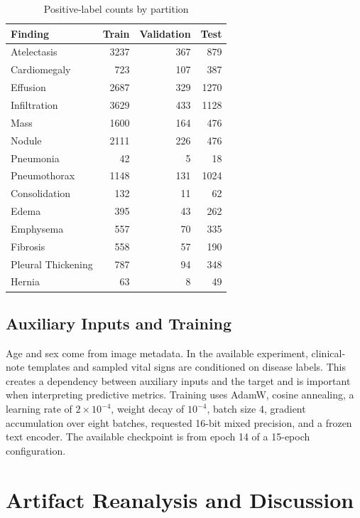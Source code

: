 \documentclass[runningheads,a4paper]{llncs}
\begin{document}
\begin{table}[htbp]
\caption{Positive-label counts by partition}
\label{tab:prevalence}
\centering\small
\begin{tabular}{lrrr}
\toprule
Finding & Train & Validation & Test\\
\midrule
Atelectasis & 3237 & 367 & 879\\
Cardiomegaly & 723 & 107 & 387\\
Effusion & 2687 & 329 & 1270\\
Infiltration & 3629 & 433 & 1128\\
Mass & 1600 & 164 & 476\\
Nodule & 2111 & 226 & 476\\
Pneumonia & 42 & 5 & 18\\
Pneumothorax & 1148 & 131 & 1024\\
Consolidation & 132 & 11 & 62\\
Edema & 395 & 43 & 262\\
Emphysema & 557 & 70 & 335\\
Fibrosis & 558 & 57 & 190\\
Pleural Thickening & 787 & 94 & 348\\
Hernia & 63 & 8 & 49\\
\bottomrule
\end{tabular}
\end{table}

\subsection{Auxiliary Inputs and Training}

Age and sex come from image metadata. In the available experiment, clinical-note templates and sampled vital signs are conditioned on disease labels. This creates a dependency between auxiliary inputs and the target and is important when interpreting predictive metrics. Training uses AdamW, cosine annealing, a learning rate of $2\times10^{-4}$, weight decay of $10^{-4}$, batch size 4, gradient accumulation over eight batches, requested 16-bit mixed precision, and a frozen text encoder. The available checkpoint is from epoch 14 of a 15-epoch configuration.

\section{Artifact Reanalysis and Discussion}
\end{document}
